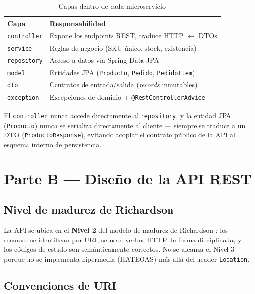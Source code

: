 \documentclass[11pt,a4paper]{article}
\begin{document}
\begin{table}[h!]
    \centering
    \begin{tabular}{@{}ll@{}}
        \toprule
        \textbf{Capa} & \textbf{Responsabilidad} \\
        \midrule
        \texttt{controller} & Expone los endpoints REST, traduce HTTP $\leftrightarrow$ DTOs \\
        \texttt{service} & Reglas de negocio (SKU único, stock, existencia) \\
        \texttt{repository} & Acceso a datos vía Spring Data JPA \\
        \texttt{model} & Entidades JPA (\texttt{Producto}, \texttt{Pedido}, \texttt{PedidoItem}) \\
        \texttt{dto} & Contratos de entrada/salida (\emph{records} inmutables) \\
        \texttt{exception} & Excepciones de dominio + \texttt{@RestControllerAdvice} \\
        \bottomrule
    \end{tabular}
    \caption{Capas dentro de cada microservicio}
\end{table}

El \texttt{controller} nunca accede directamente al \texttt{repository}, y la
entidad JPA (\texttt{Producto}) nunca se serializa directamente al cliente —
siempre se traduce a un DTO (\texttt{ProductoResponse}), evitando acoplar el
contrato público de la API al esquema interno de persistencia.

\section{Parte B — Diseño de la API REST}

\subsection{Nivel de madurez de Richardson}

La API se ubica en el \textbf{Nivel 2} del modelo de madurez de Richardson
\cite{richardson2018}: los recursos se identifican por URI, se usan verbos
HTTP de forma disciplinada, y los códigos de estado son semánticamente
correctos. No se alcanza el Nivel 3 porque no se implementa hipermedia
(HATEOAS) más allá del header \texttt{Location}.

\subsection{Convenciones de URI}
\end{document}
